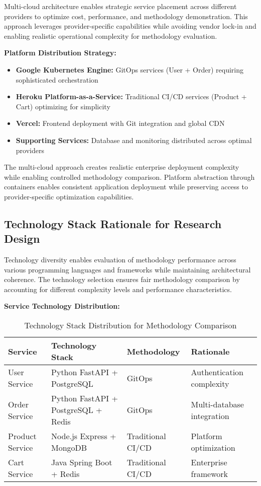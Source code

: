 Multi-cloud architecture enables strategic service placement across different providers to optimize cost, performance, and methodology demonstration. This approach leverages provider-specific capabilities while avoiding vendor lock-in and enabling realistic operational complexity for methodology evaluation.

\textbf{Platform Distribution Strategy:}
\begin{itemize}
\item \textbf{Google Kubernetes Engine:} GitOps services (User + Order) requiring sophisticated orchestration
\item \textbf{Heroku Platform-as-a-Service:} Traditional CI/CD services (Product + Cart) optimizing for simplicity
\item \textbf{Vercel:} Frontend deployment with Git integration and global CDN
\item \textbf{Supporting Services:} Database and monitoring distributed across optimal providers
\end{itemize}

The multi-cloud approach creates realistic enterprise deployment complexity while enabling controlled methodology comparison. Platform abstraction through containers enables consistent application deployment while preserving access to provider-specific optimization capabilities.

\subsection{Technology Stack Rationale for Research Design}

Technology diversity enables evaluation of methodology performance across various programming languages and frameworks while maintaining architectural coherence. The technology selection ensures fair methodology comparison by accounting for different complexity levels and performance characteristics.

\textbf{Service Technology Distribution:}

\begin{table}[h]
\centering
\begin{tabular}{|l|l|l|l|}
\hline
\textbf{Service} & \textbf{Technology Stack} & \textbf{Methodology} & \textbf{Rationale} \\
\hline
User Service & Python FastAPI + PostgreSQL & GitOps & Authentication complexity \\
\hline
Order Service & Python FastAPI + PostgreSQL + Redis & GitOps & Multi-database integration \\
\hline
Product Service & Node.js Express + MongoDB & Traditional CI/CD & Platform optimization \\
\hline
Cart Service & Java Spring Boot + Redis & Traditional CI/CD & Enterprise framework \\
\hline
\end{tabular}
\caption{Technology Stack Distribution for Methodology Comparison}
\end{table}

